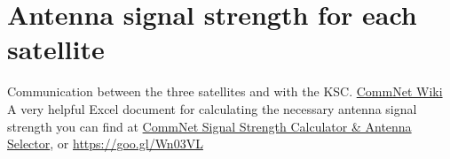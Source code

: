 \documentclass[12pt,paper=A4,numbers=noenddot,bibliography=totoc,listof=totoc,DIV=11,BCOR=1mm]{scrreprt}
\begin{document}
\section*{Antenna signal strength for each satellite}
Communication between the three satellites and with the KSC.
\href{https://wiki.kerbalspaceprogram.com/wiki/CommNet}{CommNet Wiki} \\
A very helpful Excel document for calculating the necessary antenna signal strength you can find at
\href{https://forum.kerbalspaceprogram.com/index.php?/topic/149099-commnet-signal-strength-calculator-antenna-selector/}{CommNet Signal Strength Calculator \& Antenna Selector}, or \url{https://goo.gl/Wn03VL}
\pagebreak 

\thispagestyle{empty}
\vspace*{-4cm}
\noindent{}
\linebreak 
\end{document}
